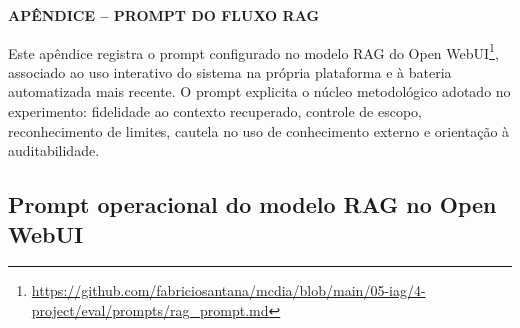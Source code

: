 \clearpage
{}
{}
\begin{center}
\textbf{APÊNDICE  -- PROMPT DO FLUXO RAG}
\end{center}
\label{sec:apendice-prompt-rag}

Este apêndice registra o prompt configurado no modelo RAG do Open WebUI\footnote{\url{https://github.com/fabriciosantana/mcdia/blob/main/05-iag/4-project/eval/prompts/rag_prompt.md}}, associado ao uso interativo do sistema na própria plataforma e à bateria automatizada mais recente. O prompt explicita o núcleo metodológico adotado no experimento: fidelidade ao contexto recuperado, controle de escopo, reconhecimento de limites, cautela no uso de conhecimento externo e orientação à auditabilidade.

\subsection{Prompt operacional do modelo RAG no Open WebUI}

